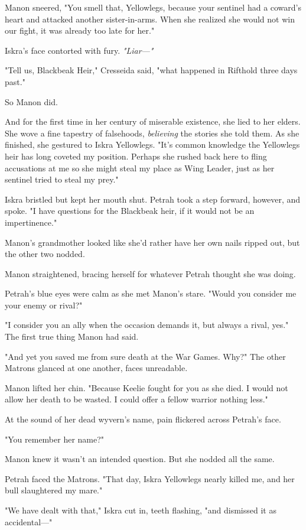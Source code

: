 Manon sneered, "You smell that, Yellowlegs, because your sentinel had a coward's heart and attacked another sister-in-arms.
When she realized she would not win our fight, it was already too late for her."

Iskra's face contorted with fury.
\emph{"Liar---"}

"Tell us, Blackbeak Heir," Cresseida said, "what happened in Rifthold three days past."

So Manon did.

And for the first time in her century of miserable existence, she lied to her elders.
She wove a fine tapestry of falsehoods, \emph{believing}
the stories she told them.
As she finished, she gestured to Iskra Yellowlegs.
"It's common knowledge the Yellowlegs heir has long coveted my position.
Perhaps she rushed back here to fling accusations at me so she might steal my place as Wing Leader, just as her sentinel tried to steal my prey."

Iskra bristled but kept her mouth shut.
Petrah took a step forward, however, and spoke.
"I have questions for the Blackbeak heir, if it would not be an impertinence."

Manon's grandmother looked like she'd rather have her own nails ripped out, but the other two nodded.

Manon straightened, bracing herself for whatever Petrah thought she was doing.

Petrah's blue eyes were calm as she met Manon's stare.
"Would you consider me your enemy or rival?"

"I consider you an ally when the occasion demands it, but always a rival, yes."
The first true thing Manon had said.

"And yet you saved me from sure death at the War Games.
Why?"
The other Matrons glanced at one another, faces unreadable.

Manon lifted her chin.
"Because Keelie fought for you as she died.
I would not allow her death to be wasted.
I could offer a fellow warrior nothing less."

At the sound of her dead wyvern's name, pain flickered across Petrah's face.

"You remember her name?"

Manon knew it wasn't an intended question.
But she nodded all the same.

Petrah faced the Matrons.
"That day, Iskra Yellowlegs nearly killed me, and her bull slaughtered my mare."

"We have dealt with that," Iskra cut in, teeth flashing, "and dismissed it as accidental---"


